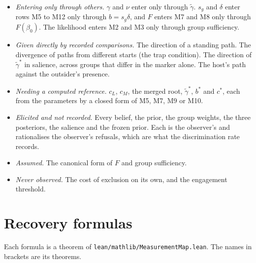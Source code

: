 \documentclass[11pt]{article}
\begin{document}
\begin{itemize}
\item \emph{Entering only through others.} $\gamma$ and $\nu$ enter only
  through $\tilde\gamma$. $s_g$ and $\delta$ enter rows M5 to M12 only through
  $b=s_g\delta$, and $F$ enters M7 and M8 only through $F(\beta_0)$. The
  likelihood enters M2 and M3 only through group sufficiency.
\item \emph{Given directly by recorded comparisons.} The direction of a
  standing path. The divergence of paths from different starts (the trap
  condition). The direction of $\tilde\gamma^\ast$ in salience, across groups
  that differ in the marker alone. The host's path against the outsider's
  presence.
\item \emph{Needing a computed reference.} $c_L$, $c_M$, the merged root,
  $\tilde\gamma^\ast$, $b^\ast$ and $c^\ast$, each from the parameters by a
  closed form of M5, M7, M9 or M10.
\item \emph{Elicited and not recorded.} Every belief, the prior, the group
  weights, the three posteriors, the salience and the frozen prior. Each is
  the observer's and rationalises the observer's refusals, which are what the
  discrimination rate records.
\item \emph{Assumed.} The canonical form of $F$ and group sufficiency.
\item \emph{Never observed.} The cost of exclusion on its own, and the
  engagement threshold.
\end{itemize}

\section*{Recovery formulas}

Each formula is a theorem of \texttt{lean/mathlib/MeasurementMap.lean}. The names in
brackets are its theorems.
\end{document}
